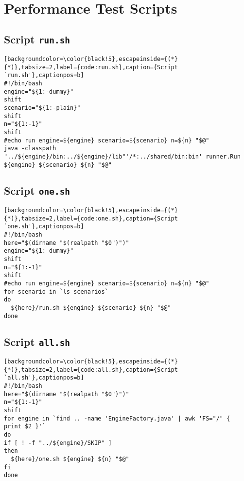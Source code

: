 \section*{Performance Test Scripts}
\label{appendix:testscripts}

\subsection*{Script \texttt{run.sh}}
\label{appendix:run.sh}

\begin{lstlisting}[backgroundcolor=\color{black!5},escapeinside={(*}{*)},tabsize=2,label={code:run.sh},caption={Script `run.sh'},captionpos=b]
#!/bin/bash
engine="${1:-dummy}"
shift
scenario="${1:-plain}"
shift
n="${1:-1}"
shift
#echo run engine=${engine} scenario=${scenario} n=${n} "$@"
java -classpath "../${engine}/bin:../${engine}/lib"'/*:../shared/bin:bin' runner.Run ${engine} ${scenario} ${n} "$@"
\end{lstlisting}

\subsection*{Script \texttt{one.sh}}
\label{appendix:one.sh}

\begin{lstlisting}[backgroundcolor=\color{black!5},escapeinside={(*}{*)},tabsize=2,label={code:one.sh},caption={Script `one.sh'},captionpos=b]
#!/bin/bash
here="$(dirname "$(realpath "$0")")"
engine="${1:-dummy}"
shift
n="${1:-1}"
shift
#echo run engine=${engine} scenario=${scenario} n=${n} "$@"
for scenario in `ls scenarios`
do
  ${here}/run.sh ${engine} ${scenario} ${n} "$@"
done
\end{lstlisting}

\subsection*{Script \texttt{all.sh}}
\label{appendix:all.sh}

\begin{lstlisting}[backgroundcolor=\color{black!5},escapeinside={(*}{*)},tabsize=2,label={code:all.sh},caption={Script `all.sh'},captionpos=b]
#!/bin/bash
here="$(dirname "$(realpath "$0")")"
n="${1:-1}"
shift
for engine in `find .. -name 'EngineFactory.java' | awk 'FS="/" { print $2 }'`
do
if [ ! -f "../${engine}/SKIP" ]
then
  ${here}/one.sh ${engine} ${n} "$@"
fi
done
\end{lstlisting}

